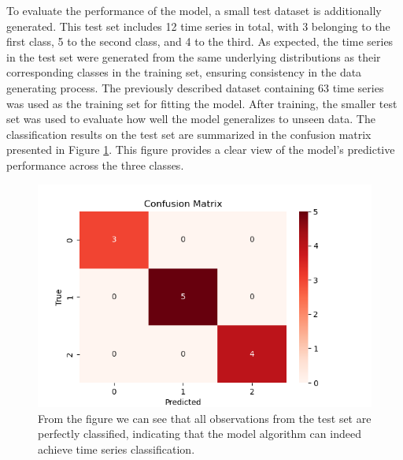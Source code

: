 \noindent To evaluate the performance of the model, a small test dataset is additionally generated. This test set includes 12 time series in total, with 3 belonging to the first class, 5 to the second class, and 4 to the third. As expected, the time series in the test set were generated from the same underlying distributions as their corresponding classes in the training set, ensuring consistency in the data generating process. The previously described dataset containing 63 time series was used as the training set for fitting the model. After training, the smaller test set was used to evaluate how well the model generalizes to unseen data. The classification results on the test set are summarized in the confusion matrix presented in Figure \ref{fig:confusion_ex}. This figure provides a clear view of the model's predictive performance across the three classes.\\
\begin{figure}[h!]
	\centering
	\includegraphics[width=0.9\linewidth]{../Statistical_Sciences_template/figure/Confusion matrix of Shapelet Example.png}
	\caption{From the figure we can see that all observations from the test set are perfectly classified, indicating that the model algorithm can indeed achieve time series classification.}
	\label{fig:confusion_ex}
\end{figure}

